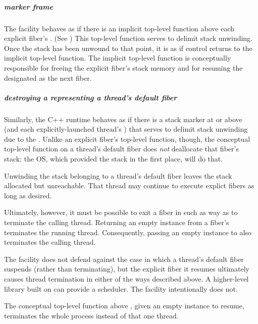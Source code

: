 \subparagraph{marker frame}

The \fiber facility behaves as if there is an implicit top-level function above
each explicit fiber's \entryfn. (See ) This
top-level function serves to delimit stack unwinding. Once the stack has been
unwound to that point, it is as if control returns to the implicit top-level function. The
implicit top-level function is conceptually responsible for freeing the explicit fiber's
stack memory and for resuming the \fiber designated as the next fiber.

\subparagraph{destroying a \fiber representing a thread's default fiber}

Similarly, the C++ runtime behaves as if there is a stack marker at or above \main (and
each explicitly-launched thread's \entryfn) that serves to delimit stack
unwinding due to the \foreignex. Unlike an explicit fiber's top-level
function, though, the conceptual top-level function on a thread's default fiber
does \emph{not} deallocate that fiber's stack: the OS, which provided the
stack in the first place, will do that.

Unwinding the stack belonging to a thread's default fiber leaves the stack
allocated but unreachable. That thread may continue to execute explict fibers
as long as desired.

Ultimately, however, it must be possible to exit a fiber in such as way as to
terminate the calling thread. Returning an empty \fiber instance from
a fiber's \entryfn terminates the running thread. Consequently, passing an
empty \fiber instance to \unwindfib also terminates the calling thread.

The \fiber facility does not defend against the case in which a thread's
default fiber suspends (rather than terminating), but the explicit fiber it
resumes ultimately causes thread termination in either of the ways described
above. A higher-level library built on \fiber can provide a scheduler.
The \fiber facility intentionally does not.

The conceptual top-level function above \main, given an empty \fiber instance to resume,
terminates the whole process instead of that one thread.
